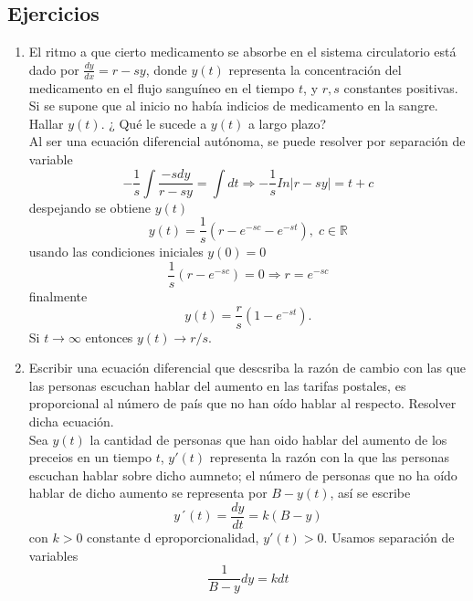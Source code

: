 \documentclass[10pt,a4paper,notitlepage]{report}
\begin{document}
\begin{itemize}
\section{Ejercicios}
\begin{enumerate}
\item El ritmo a que cierto medicamento se absorbe en el sistema circulatorio está dado por $\frac{dy}{dx} = r -sy$, donde $y(t)$ representa la concentración del medicamento en el flujo sanguíneo en el tiempo $t$, y $r, s$ constantes positivas. Si se supone que al inicio no había indicios de medicamento en la sangre. Hallar $y(t)$. ¿ Qué le sucede a $y(t)$ a largo plazo? \\
\large
Al ser una ecuación diferencial autónoma, se puede resolver por separación de variable
\begin{equation}
 - \frac{1}{s} \int \frac{-sdy}{r - sy} = \int dt \Rightarrow - \frac{1}{s} In |r - sy| = t + c
\end{equation}
despejando se obtiene $y(t)$
\begin{equation}
y(t) = \frac{1}{s} (r - e^{-sc} - e^{-st}), \; c \in \mathbb{R}
\end{equation}
usando las condiciones iniciales $y(0) = 0$
\begin{equation}
\frac{1}{s} (r - e^{-sc}) = 0 \Rightarrow r= e^{-sc} 
\end{equation}
finalmente
\begin{equation}
y(t) = \frac{r}{s} (1 - e^{-st}).
\end{equation}
Si $t \rightarrow \infty$ entonces $y(t) \rightarrow r/s$.
\Large
\item Escribir una ecuación diferencial que descsriba la razón de cambio con las que las personas escuchan hablar del aumento en las tarifas postales, es proporcional al número de país que no han oído hablar al respecto. Resolver dicha ecuación.\\
\large
Sea $y (t)$ la cantidad de personas que han oido hablar del aumento de los preceios en un tiempo $t$, $y'(t)$ representa la razón con la que las personas escuchan hablar sobre dicho aumneto; el número de personas que no ha oído hablar de dicho aumento se representa por $B - y(t)$, así se escribe
\begin{equation}
y´(t) = \frac{dy}{dt} = k (B - y)
\end{equation}
con $k >0$ constante d eproporcionalidad, $y'(t) > 0$.
Usamos separación de variables
\begin{equation}
\frac{1}{B - y} dy = kdt
\end{equation}

\end{enumerate}
\end{itemize}
\end{document}

